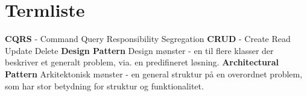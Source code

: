\section{Termliste}
\textbf{CQRS} - Command Query Responsibility Segregation
\newline
\textbf{CRUD} - Create Read Update Delete
\newline
\textbf{Design Pattern} Design mønster - en til flere klasser der beskriver et generalt problem, via. en predifineret løsning. 
\newline
\textbf{Architectural Pattern} Arkitektonisk mønster - en general struktur på en overordnet problem, som har stor betydning for struktur og funktionalitet.

